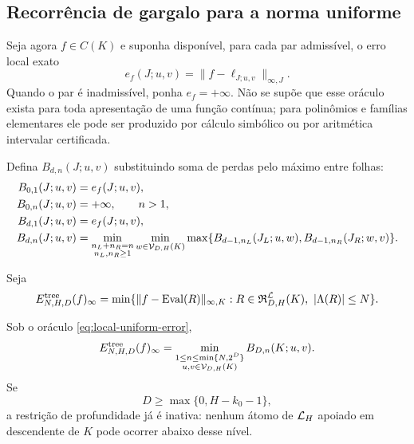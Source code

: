 \subsection{Recorrência de gargalo para a norma uniforme}

Seja agora $f\in C(K)$ e suponha disponível, para cada par admissível, o erro
local exato
\begin{equation}
 e_f(J;u,v)=\|f-\ell_{J;u,v}\|_{\infty,J}.
 \label{eq:local-uniform-error}
\end{equation}
Quando o par é inadmissível, ponha $e_f=+\infty$. Não se supõe que esse oráculo
exista para toda apresentação de uma função contínua; para polinômios e
famílias elementares ele pode ser produzido por cálculo simbólico ou por
aritmética intervalar certificada.

Defina $B_{d,n}(J;u,v)$ substituindo soma de perdas pelo máximo entre folhas:
\begin{align}
 B_{0,1}(J;u,v)&=e_f(J;u,v),\label{eq:bottleneck-base}\\
 B_{0,n}(J;u,v)&=+\infty,\qquad n>1,\notag\\
 B_{d,1}(J;u,v)&=e_f(J;u,v),\label{eq:bottleneck-one}\\
 B_{d,n}(J;u,v)
 &=\min_{\substack{n_L+n_R=n\\n_L,n_R\ge1}}
 \min_{w\in\mathcal{V}_{D,H}(K)}
 \max\{B_{d-1,n_L}(J_L;u,w),
       B_{d-1,n_R}(J_R;w,v)\}.
 \label{eq:bottleneck-recurrence}
\end{align}

Seja
\begin{equation}
 E_{N,H,D}^{\rm tree}(f)_\infty
 =\min\{\|f-\operatorname{Eval}(R)\|_{\infty,K}:
 R\in\mathfrak{R}_{D,H}^{\mathcal{L}}(K),\
 |\Lambda(R)|\le N\}.
 \label{eq:truncated-tree-error}
\end{equation}

\begin{theorem}
\label{thm:bottleneck}
Sob o oráculo \eqref{eq:local-uniform-error},
\begin{equation}
 E_{N,H,D}^{\rm tree}(f)_\infty
 =\min_{\substack{1\le n\le\min\{N,2^D\}\\
                  u,v\in\mathcal{V}_{D,H}(K)}}
 B_{D,n}(K;u,v).
 \label{eq:bottleneck-optimum}
\end{equation}
Se
\begin{equation}
 D\ge \max\{0,H-k_0-1\},
 \label{eq:depth-inactive}
\end{equation}
a restrição de profundidade já é inativa: nenhum átomo de $\mathcal{L}_H$
apoiado em descendente de $K$ pode ocorrer abaixo desse nível.
\end{theorem}


